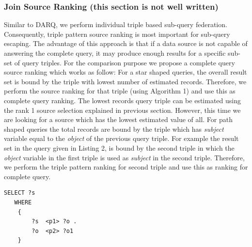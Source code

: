 \documentclass{sig-alternate}  %
\begin{document}
\subsubsection{Join Source Ranking (this section is not well written)}
Similar to DARQ, we perform individual triple based sub-query federation. Consequently, triple pattern source ranking is most important for sub-query escaping. The advantage of this approach is that if a data source is not capable of answering the complete query, it may produce enough results for a specific sub-set of query triples. For the comparison purpose we propose a complete query source ranking which works as follow: For a star shaped queries, the overall result set is bound by the triple with lowest number of estimated records. Therefore, we perform the source ranking for that triple (using Algorithm 1) and use this as complete query ranking. The lowest records query triple can be estimated using the rank 1 source selection explained in previous section. However, this time we are looking for a source which has the lowest estimated value of all. For path shaped queries the total records are bound by the triple which has \emph{subject} variable equal to the \emph{object} of the previous query triple. For example the result set in the query given in Listing 2, is bound by the second triple in which the \emph{object} variable in the first triple is used as \emph{subject} in the second triple. Therefore, we perform the triple pattern ranking for second triple and use this as ranking for complete query.
%
\begin{lstlisting}[caption = {A P-1 query example},frame = single,language=SPARQL]
 SELECT ?s 
   WHERE
    {
        ?s  <p1> ?o .
        ?o  <p2> ?o1
    }
\end{lstlisting}
\end{document}
